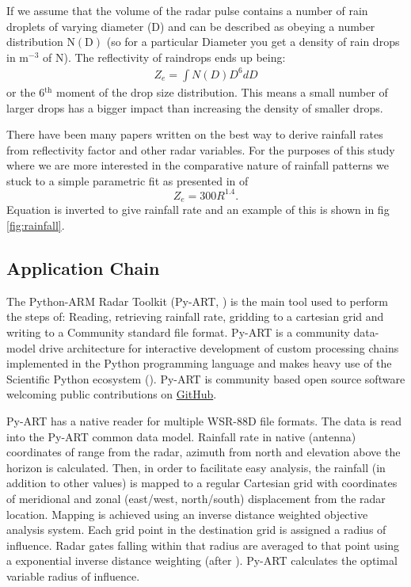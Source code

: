\documentclass[twocol]{ametsoc}
\begin{document}
If we assume that the volume of the radar pulse contains a number of rain droplets of varying diameter (D) and can be described 
as obeying a number distribution $\mathrm{N(D)}$ (so for a particular Diameter you get a density of rain drops in $\mathrm{m^{-3}}$ 
of N). The reflectivity of raindrops ends up being:
\begin{align*}
Z_e = \int{N(D)D^6dD}
\end{align*}
or the 6$\mathrm{^{th}}$ moment of the drop size distribution. This means a small number of larger drops has a bigger
 impact than increasing the density of smaller drops. 
 
 There have been many papers written on the best way to derive rainfall rates from reflectivity factor and other radar variables. 
 For the purposes of this study where we are more interested in the comparative nature of rainfall patterns we stuck to a simple 
 parametric fit as presented in \cite{gu_polarimetric_2011} of
\begin{equation}
\label{eq:zr}
 Z_e=300R^{1.4}.
 \end{equation}
Equation is inverted to give rainfall rate and an example of this is shown in fig \ref{fig:rainfall}.

\subsection{Application Chain}
\label{sec:ac}
The Python-ARM Radar Toolkit (Py-ART, \cite{heistermann_emergence_2014})  is the main
tool used to perform the steps of: Reading, retrieving rainfall rate, gridding to a 
cartesian grid and writing to a Community standard file format. 
Py-ART is a community data-model drive architecture for interactive development
 of custom processing chains implemented in the Python programming 
language and makes heavy use of the Scientific Python ecosystem (\cite{scipy}). 
Py-ART is community based open source software welcoming
 public contributions on \href{https://github.com/ARM-DOE/pyart}{GitHub}.

Py-ART has a native reader for multiple WSR-88D file formats. The data is read 
into the Py-ART common data model. Rainfall rate in native (antenna) coordinates
of range from the radar, azimuth from north and elevation above the horizon is
 calculated. Then, in order to facilitate easy analysis, the rainfall (in addition to other values) 
is mapped to a regular Cartesian grid with coordinates of meridional and zonal 
(east/west, north/south) displacement from the radar location. Mapping is 
achieved using an inverse distance weighted objective analysis system. Each grid point in the
 destination grid is assigned a radius of influence. Radar gates falling within that radius are 
 averaged to that point using a exponential inverse distance weighting (after \cite{barnes_technique_1964}).
  Py-ART calculates the optimal variable radius of influence. 
\end{document}
